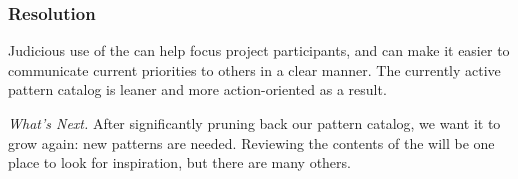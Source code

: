 \subsubsection*{Resolution} 
Judicious use of the  can help focus project participants, and can make it easier to communicate current priorities to others in a clear manner.  The currently active pattern catalog is leaner and more action-oriented as a result.

\begin{framed}
\emph{What's Next.}
After significantly pruning back our pattern catalog, we want it to grow again: new patterns are needed.  Reviewing the contents of the  will be one place to look for inspiration, but there are many others.
\end{framed}


